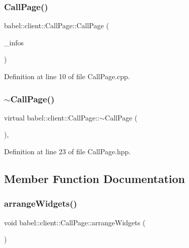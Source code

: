 \subsubsection{\texorpdfstring{Call\+Page()}{CallPage()}}
{\footnotesize\ttfamily babel\+::client\+::\+Call\+Page\+::\+Call\+Page (\begin{DoxyParamCaption}\item[{\mbox{\hyperlink{classbabel_1_1client_1_1_client_info}{Client\+Info}} \&}]{\+\_\+infos }\end{DoxyParamCaption})\hspace{0.3cm}{\ttfamily [explicit]}}



Definition at line 10 of file Call\+Page.\+cpp.

\mbox{\label{classbabel_1_1client_1_1_call_page_ab76eba4b12401b785d9d75786b386a54}} 
\subsubsection{\texorpdfstring{$\sim$\+Call\+Page()}{~CallPage()}}
{\footnotesize\ttfamily virtual babel\+::client\+::\+Call\+Page\+::$\sim$\+Call\+Page (\begin{DoxyParamCaption}{ }\end{DoxyParamCaption})\hspace{0.3cm}{\ttfamily [inline]}, {\ttfamily [virtual]}}



Definition at line 23 of file Call\+Page.\+hpp.



\subsection{Member Function Documentation}
\mbox{\label{classbabel_1_1client_1_1_call_page_a083eb526e44f03c413fc7841bd2d45f9}} 
\subsubsection{\texorpdfstring{arrange\+Widgets()}{arrangeWidgets()}}
{\footnotesize\ttfamily void babel\+::client\+::\+Call\+Page\+::arrange\+Widgets (\begin{DoxyParamCaption}{ }\end{DoxyParamCaption})}



